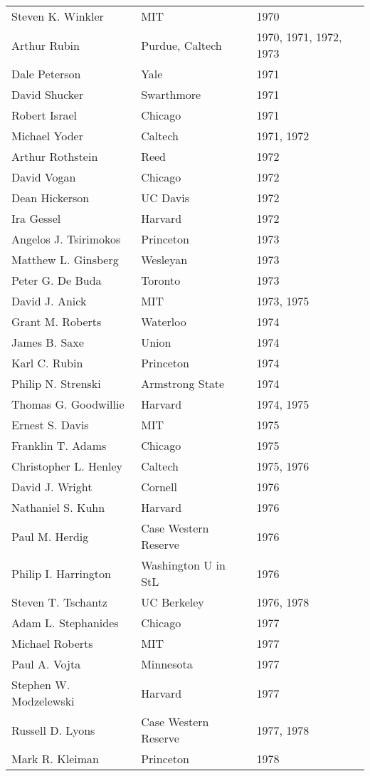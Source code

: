 \documentclass[12pt]{article}
\begin{document}
\begin{tabular}{|l|l|l|}
Steven K. Winkler & MIT & 1970 \\
Arthur Rubin & Purdue, Caltech & 1970, 1971, 1972, 1973 \\
Dale Peterson & Yale & 1971 \\
David Shucker & Swarthmore & 1971 \\
Robert Israel & Chicago & 1971 \\
Michael Yoder & Caltech & 1971, 1972 \\
Arthur Rothstein & Reed & 1972 \\
David Vogan & Chicago & 1972 \\
Dean Hickerson & UC Davis & 1972 \\
Ira Gessel & Harvard & 1972 \\
Angelos J. Tsirimokos & Princeton & 1973 \\
Matthew L. Ginsberg & Wesleyan & 1973 \\
Peter G. De Buda & Toronto & 1973 \\
David J. Anick & MIT & 1973, 1975 \\
Grant M. Roberts & Waterloo & 1974 \\
James B. Saxe & Union & 1974 \\
Karl C. Rubin & Princeton & 1974 \\
Philip N. Strenski & Armstrong State & 1974 \\
Thomas G. Goodwillie & Harvard & 1974, 1975 \\
Ernest S. Davis & MIT & 1975 \\
Franklin T. Adams & Chicago & 1975 \\
Christopher L. Henley & Caltech & 1975, 1976 \\
David J. Wright & Cornell & 1976 \\
Nathaniel S. Kuhn & Harvard & 1976 \\
Paul M. Herdig & Case Western Reserve & 1976 \\
Philip I. Harrington & Washington U in StL & 1976 \\
Steven T. Tschantz & UC Berkeley & 1976, 1978 \\
Adam L. Stephanides & Chicago & 1977 \\
Michael Roberts & MIT & 1977 \\
Paul A. Vojta & Minnesota & 1977 \\
Stephen W. Modzelewski & Harvard & 1977 \\
Russell D. Lyons & Case Western Reserve & 1977, 1978 \\
Mark R. Kleiman & Princeton & 1978 \\

\end{tabular}
\end{document}
